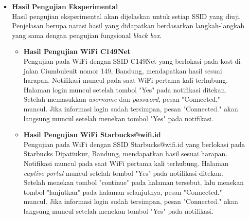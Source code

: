 \documentclass[a4paper,twoside]{article}
\begin{document}
\begin{enumerate}
\begin{itemize}
{\begin{itemize}
{                        \begin{itemize}
                            \item{\textit{C149Net} pada kost di jalan Ciumbuleuit nomor 149, Bandung.}
                            \item{\textit{Starbucks@wifi.id} pada Starbucks Dipatiukur, Bandung.}
                            \item{\textit{wifi.id} pada Starbucks Dipatiukur, Bandung.}
                            \item{\textit{UNPAR9} pada gedung 10 Universitas Katolik Parahyangan, Bandung.}
                            \item{\textit{FTIS.cisco} pada gedung 9 Universitas Katolik Parahyangan, Bandung.}
                        \end{itemize}
                    }
                    \item{
                        {\bf Hasil Pengujian Eksperimental}\\
                        Hasil pengujian eksperimental akan dijelaskan untuk setiap SSID yang diuji. Penjelasan berupa narasi hasil yang didapatkan berdasarkan langkah-langkah yang sama dengan pengujian fungsional \textit{black box}.
                        \begin{itemize}
                            \item{
                                {\bf Hasil Pengujian WiFi C149Net}\\
                                Pengujian pada WiFi dengan SSID C149Net yang berlokasi pada kost di jalan Ciumbuleuit nomor 149, Bandung, mendapatkan hasil sesuai harapan. Notifikasi muncul pada saat WiFi pertama kali terhubung. Halaman login muncul setelah tombol "Yes" pada notifikasi ditekan. Setelah memasukkan \textit{username} dan \textit{password}, pesan "Connected." muncul. Jika informasi login sudah tersimpan, pesan "Connected." akan langsung muncul setelah menekan tombol "Yes" pada notifikasi.
                            }
                            \item{
                                {\bf Hasil Pengujian WiFi Starbucks@wifi.id}\\
                                Pengujian pada WiFi dengan SSID Starbucks@wifi.id yang berlokasi pada Starbucks Dipatiukur, Bandung, mendapatkan hasil sesuai harapan. Notifikasi muncul pada saat WiFi pertama kali terhubung. Halaman \textit{captive portal} muncul setelah tombol "Yes" pada notifikasi ditekan. Setelah menekan tombol "continue" pada halaman tersebut, lalu menekan tombol "lanjutkan" pada halaman selanjutnya, pesan "Connected." muncul. Jika informasi login sudah tersimpan, pesan "Connected." akan langsung muncul setelah menekan tombol "Yes" pada notifikasi.
}
\end{itemize}}
\end{itemize}}
\end{itemize}
\end{enumerate}
\end{document}
